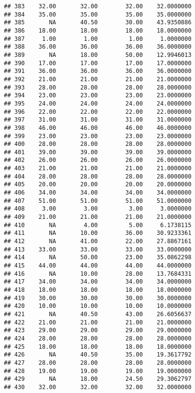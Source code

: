\documentclass[
]{article}
\begin{document}
\begin{verbatim}
## 383    32.00       32.00        32.00    32.0000000
## 384    35.00       35.00        35.00    35.0000000
## 385       NA       40.50        30.00    43.9350886
## 386    18.00       18.00        18.00    18.0000000
## 387     1.00        1.00         1.00     1.0000000
## 388    36.00       36.00        36.00    36.0000000
## 389       NA       18.00        50.00    12.9946013
## 390    17.00       17.00        17.00    17.0000000
## 391    36.00       36.00        36.00    36.0000000
## 392    21.00       21.00        21.00    21.0000000
## 393    28.00       28.00        28.00    28.0000000
## 394    23.00       23.00        23.00    23.0000000
## 395    24.00       24.00        24.00    24.0000000
## 396    22.00       22.00        22.00    22.0000000
## 397    31.00       31.00        31.00    31.0000000
## 398    46.00       46.00        46.00    46.0000000
## 399    23.00       23.00        23.00    23.0000000
## 400    28.00       28.00        28.00    28.0000000
## 401    39.00       39.00        39.00    39.0000000
## 402    26.00       26.00        26.00    26.0000000
## 403    21.00       21.00        21.00    21.0000000
## 404    28.00       28.00        28.00    28.0000000
## 405    20.00       20.00        20.00    20.0000000
## 406    34.00       34.00        34.00    34.0000000
## 407    51.00       51.00        51.00    51.0000000
## 408     3.00        3.00         3.00     3.0000000
## 409    21.00       21.00        21.00    21.0000000
## 410       NA        4.00         5.00     6.1738115
## 411       NA       10.00        36.00    30.9233361
## 412       NA       41.00        22.00    27.8867161
## 413    33.00       33.00        33.00    33.0000000
## 414       NA       50.00        23.00    35.0862298
## 415    44.00       44.00        44.00    44.0000000
## 416       NA       10.00        28.00    13.7684331
## 417    34.00       34.00        34.00    34.0000000
## 418    18.00       18.00        18.00    18.0000000
## 419    30.00       30.00        30.00    30.0000000
## 420    10.00       10.00        10.00    10.0000000
## 421       NA       40.50        43.00    26.6056637
## 422    21.00       21.00        21.00    21.0000000
## 423    29.00       29.00        29.00    29.0000000
## 424    28.00       28.00        28.00    28.0000000
## 425    18.00       18.00        18.00    18.0000000
## 426       NA       40.50        35.00    19.3617792
## 427    28.00       28.00        28.00    28.0000000
## 428    19.00       19.00        19.00    19.0000000
## 429       NA       18.00        24.50    29.3062797
## 430    32.00       32.00        32.00    32.0000000

\end{verbatim}
\end{document}
